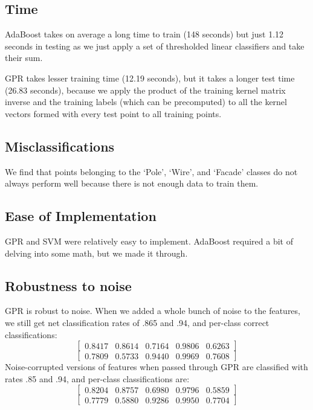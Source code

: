 \documentclass[letterpaper]{article}
\begin{document}
\subsection*{Time}
AdaBoost takes on average a long time to train (148 seconds) but just
1.12 seconds in testing as we just apply a set of thresholded linear
classifiers and take their sum. 

GPR takes lesser training time (12.19
seconds), but it takes a longer test time (26.83 seconds), because we
apply the product of the training kernel matrix inverse and the
training labels (which can be precomputed) to all the kernel vectors
formed with every test point to all training points.


\subsection*{Misclassifications}
We find that points belonging to the `Pole', `Wire', and `Facade' classes do not always perform well because there is not enough data to train them.
\subsection*{Ease of Implementation}
GPR and SVM were relatively easy to implement. AdaBoost required a bit of delving into some math, but we made it through.
\subsection*{Robustness to noise}
GPR is robust to noise. When we added a whole bunch of noise to the features, we still get net classification rates of .865 and .94, and per-class correct classifications:
$$\begin{bmatrix} 0.8417 &   0.8614 &   0.7164   & 0.9806  &  0.6263\end{bmatrix}$$
$$\begin{bmatrix} 0.7809  &  0.5733  &  0.9440&    0.9969    &0.7608\end{bmatrix}$$
Noise-corrupted versions of features when passed through GPR are classified with rates .85 and .94, and per-class classifications are:
$$\begin{bmatrix} 0.8204  &  0.8757 &   0.6980  &  0.9796 &   0.5859\end{bmatrix}$$
$$\begin{bmatrix} 0.7779  &  0.5880  &  0.9286  &  0.9950 &   0.7704\end{bmatrix}$$
\end{document}

